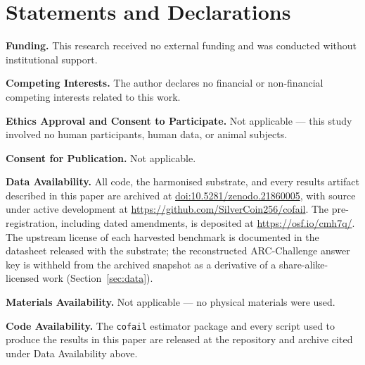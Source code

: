 \documentclass[pdflatex,sn-mathphys-ay]{sn-jnl}
\theoremstyle{thmstyleone}
\theoremstyle{thmstylethree}
\begin{document}
\section*{Statements and Declarations}

\textbf{Funding.} This research received no external funding and was conducted without
institutional support.

\textbf{Competing Interests.} The author declares no financial or non-financial competing
interests related to this work.

\textbf{Ethics Approval and Consent to Participate.} Not applicable --- this study involved no
human participants, human data, or animal subjects.

\textbf{Consent for Publication.} Not applicable.

\textbf{Data Availability.} All code, the harmonised substrate, and every results artifact
described in this paper are archived at
\href{https://doi.org/10.5281/zenodo.21860005}{doi:10.5281/zenodo.21860005}, with source under
active development at \url{https://github.com/SilverCoin256/cofail}. The pre-registration,
including dated amendments, is deposited at \url{https://osf.io/cmh7q/}. The upstream license of
each harvested benchmark is documented in the datasheet released with the substrate; the
reconstructed ARC-Challenge answer key is withheld from the archived snapshot as a derivative of
a share-alike-licensed work (Section~\ref{sec:data}).

\textbf{Materials Availability.} Not applicable --- no physical materials were used.

\textbf{Code Availability.} The \texttt{cofail} estimator package and every script used to
produce the results in this paper are released at the repository and archive cited under Data
Availability above.
\end{document}
